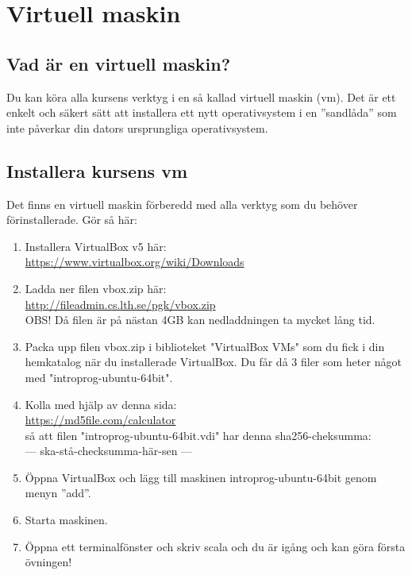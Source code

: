 
\chapter{Virtuell maskin}\label{appendix:vbox}

\section{Vad är en virtuell maskin?}

Du kan köra alla kursens verktyg i en så kallad virtuell maskin (vm). Det är ett enkelt och säkert sätt att installera ett nytt operativsystem i en ''sandlåda'' som inte påverkar din dators ursprungliga operativsystem. 

\section{Installera kursens vm}
Det finns en virtuell maskin förberedd med alla verktyg som du behöver förinstallerade. Gör så här:
\begin{enumerate}
\item     Installera VirtualBox v5 här: \\ \url{https://www.virtualbox.org/wiki/Downloads}
\item     Ladda ner filen vbox.zip här: \\ \url{http://fileadmin.cs.lth.se/pgk/vbox.zip} \\ OBS! Då filen är på nästan 4GB kan nedladdningen ta mycket lång tid.
\item     Packa upp filen vbox.zip i biblioteket "VirtualBox VMs" som du fick i din hemkatalog när du installerade VirtualBox. Du får då 3 filer som heter något med "introprog-ubuntu-64bit".
\item     Kolla med hjälp av denna sida: \\ \url{https://md5file.com/calculator} \\ så att filen "introprog-ubuntu-64bit.vdi" har denna sha256-cheksumma: \\ --- ska-stå-checksumma-här-sen ---
\item     Öppna VirtualBox och lägg till maskinen introprog-ubuntu-64bit genom menyn ''add''.
\item     Starta maskinen.
\item     Öppna ett terminalfönster och skriv scala och du är igång och kan göra första övningen!
\end{enumerate}

